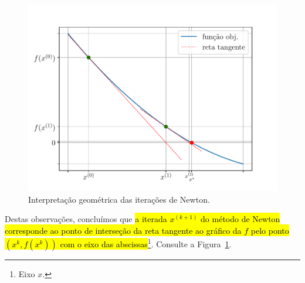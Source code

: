 \begin{figure}[H]
  \centering
  \includegraphics[width=\textwidth]{./cap_eq1d/dados/fig_Newton_geointerp/fig}
  \caption{Interpretação geométrica das iterações de Newton.}
  \label{cap_eq1d_sec_newton:fig:Newton_geointerp}
\end{figure}

Destas observações, concluímos que \hl{a iterada $x^{(k+1)}$ do método de Newton corresponde ao ponto de interseção da reta tangente ao gráfico da $f$ pelo ponto $(x^{k}, f(x^{k}))$ com o eixo das abscissas}\footnote{Eixo $x$.}. Consulte a Figura~\ref{cap_eq1d_sec_newton:fig:Newton_geointerp}.

